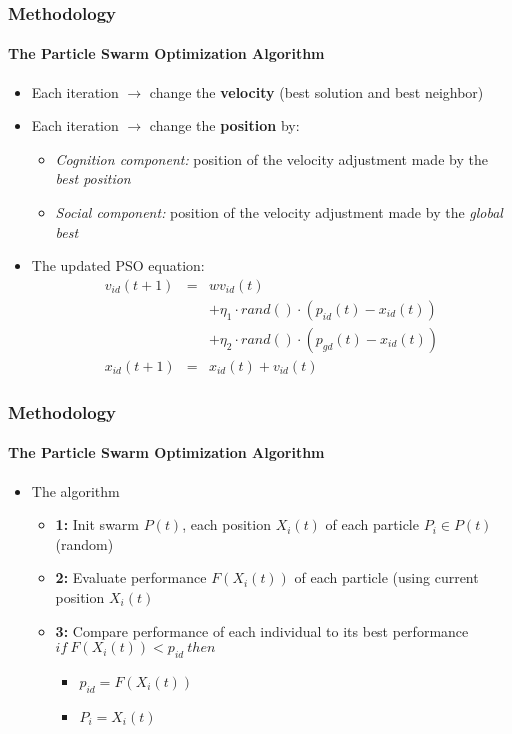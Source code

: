 \frame
{
\frametitle{Methodology}
\framesubtitle{The Particle Swarm Optimization Algorithm}
\begin{itemize}
	\item Each iteration $\rightarrow$ change the \textbf{velocity} (best solution and best neighbor)
	\item Each iteration $\rightarrow$ change the \textbf{position} by:
	\begin{itemize}
		\item \emph{Cognition component:} position of the velocity adjustment made by the \emph{best position}
		\item \emph{Social component:} position of the velocity adjustment made by the \emph{global best}
	\end{itemize}
	\item The updated PSO equation:
	\begin{eqnarray*}
	v_{id}(t+1) &=& wv_{id}(t)\\
			    & & +\eta_{1} \cdot rand() \cdot  (p_{id}(t) - x_{id}(t))\\
				& & +\eta_{2} \cdot rand() \cdot (p_{gd}(t) - x_{id}(t))\\
	x_{id}(t+1) &=& x_{id}(t) + v_{id}(t)
	\end{eqnarray*}
\end{itemize}
}

\frame
{
\frametitle{Methodology}
\framesubtitle{The Particle Swarm Optimization Algorithm}
\begin{itemize}
	\item The algorithm
	\begin{itemize}
		\item \textbf{1:} Init swarm $P(t)$, each position $X_{i}(t)$ of each particle $P_{i} \in P(t)$ (random)
		\item \textbf{2:} Evaluate performance $F(X_{i}(t))$ of each particle (using current position $X_{i}(t)$
		\item \textbf{3:} Compare performance of each individual to its best performance $if\ F(X_{i}(t)) < p_{id}\ then$
		\begin{itemize}
			\item $p_{id} = F(X_{i}(t))$
			\item $P_{i} = X_{i}(t)$
		\end{itemize}
	\end{itemize}
\end{itemize}
}

